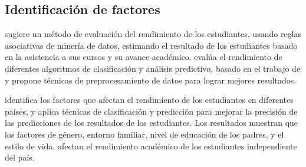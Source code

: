 



\subsection*{Identificación de factores}

\textcite{borkar2013predicting} sugiere un método de evaluación del rendimiento de los estudiantes, usando reglas asociativas de minería de datos, estimando el resultado de los estudiantes basado en la asistencia a sus cursos y su avance académico. \textcite{shazmeen2013performance} evalúa el rendimiento de diferentes algoritmos de clasificación y análisis predictivo, basado en el trabajo de \textcite{borkar2013predicting} y propone técnicas de preprocesamiento de datos para lograr mejores resultados. 

\textcite{oskouei2014predicting} identifica los factores que afectan el rendimiento de los estudiantes en diferentes países, y aplica técnicas de clasificación y predicción para mejorar la precisión de las predicciones de los resultados de los estudiantes. Los resultados muestran que los factores de género, entorno familiar, nivel de educación de los padres, y el estilo de vida, afectan el rendimiento académico de los estudiantes independiente del país.


